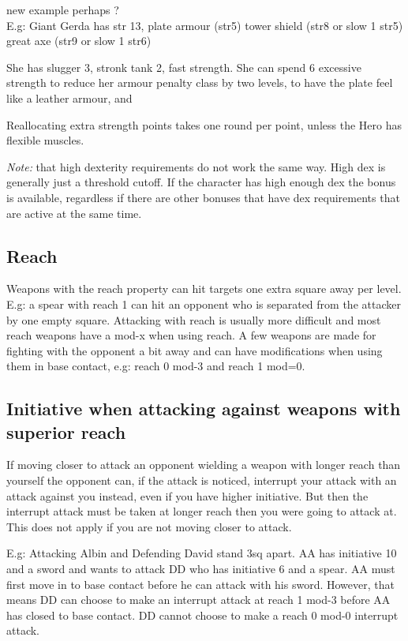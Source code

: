 \todo new example perhaps ?\\
E.g: Giant Gerda has str 13,
plate armour (str5)
tower shield (str8 or slow 1 str5)
great axe (str9 or slow 1 str6)


She has slugger 3, stronk tank 2, fast strength.
She can spend 6 excessive strength to reduce her armour penalty class by two levels, to have the plate feel like a leather armour, and

Reallocating extra strength points takes one round per point, unless the Hero has flexible muscles.

\emph{Note:} that high dexterity requirements do not work the same way. High dex is generally just a threshold cutoff. If the character has high enough dex the bonus is available, regardless if there are other bonuses that have dex requirements that are active at the same time.


\subsection*{Reach}
Weapons with the reach property can hit targets one extra square away per level.
E.g: a spear with reach 1 can hit an opponent who is separated from the attacker by one empty square. Attacking with reach is usually more difficult and most reach weapons have a mod-x when using reach.
A few weapons are made for fighting with the opponent a bit away and can have modifications when using them in base contact, e.g: reach 0 mod-3 and reach 1 mod=0.


\subsection*{Initiative when attacking against weapons with superior reach}
If moving closer to attack an opponent wielding a weapon with longer reach than yourself the opponent can, if the attack is noticed, interrupt your attack with an attack against you instead, even if you have higher initiative. But then the interrupt attack must be taken at longer reach then you were going to attack at. This does not apply if you are not moving closer to attack.

E.g: Attacking Albin and Defending David stand 3sq apart. AA has initiative 10 and a sword and wants to attack DD who has initiative 6 and a spear. AA must first move in to base contact before he can attack with his sword. However, that means DD can choose to make an interrupt attack at reach 1 mod-3 before AA has closed to base contact. DD cannot choose to make a reach 0 mod-0 interrupt attack.

